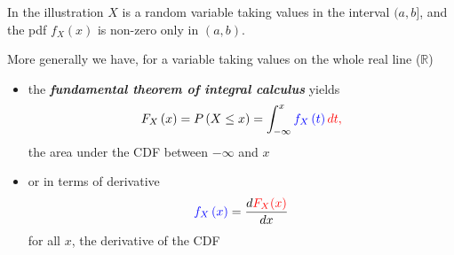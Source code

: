 \documentclass[notes=show,smaller]{beamer}\usepackage[]{graphicx}\usepackage[]{color}
\renewcommand{\Pr}{P}
\newenvironment{stepitemize}{\begin{itemize}[<+->]}{\end{itemize} }
\begin{document}
\begin{frame}{\secname}
  In the illustration $X$ is a random variable taking values in the interval $(a,b]$, and the pdf $f_{X}\left( x\right) $ is non-zero only in $(a,b)$.

  \medskip

  More generally we have, for a variable taking values on the whole real line ($\mathbb{R}$) \medskip

  \begin{itemize}
  \item the \textbf{\emph{fundamental theorem of integral calculus}} yields
  \color{red}
  $$F_{X}\left( x\right) =\Pr \left( X\leq x\right) =\int_{-\infty}^{x}\color{blue}f_{X}\left(
  t\right)\color{red} dt,$$%
  \color{black}
  the area under the CDF between $-\infty$ and $x$ \medskip

  \item or in terms of derivative
  $$
  \color{blue}f_{X}\left( x\right) \color{black} = \frac{d\color{red}F_{X}(x) \color{black}}{\color{black} dx}
  $$
  for all $x$, the derivative of the CDF
  \end{itemize}
\end{frame}%
\end{document}
